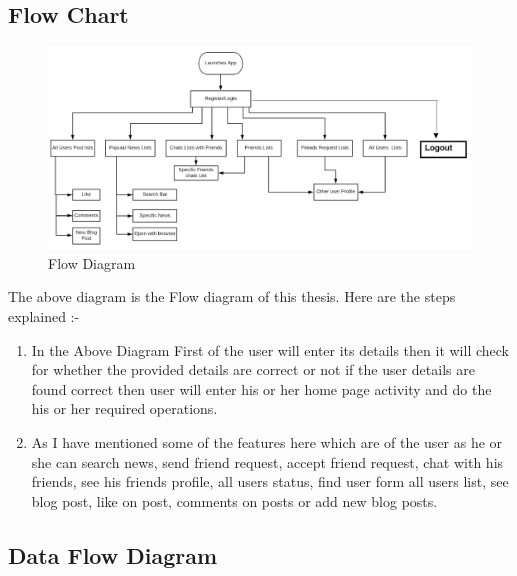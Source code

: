 \subsection{Flow Chart}
\noindent
\begin{figure}[!ht]
	\centering
	\includegraphics[scale=0.3]{flow-diagram.png}
	\caption{\label{img2} Flow Diagram}
\end{figure}

\noindent
The above diagram is the Flow diagram of this thesis. Here are the steps explained :-
\begin{enumerate}
	\setlength{\itemsep}{-0.3em}
	\item In the Above Diagram First of the user will enter its details then it will check
	for whether the provided details are correct or not if the user details are found
	correct then user will enter his or her home page activity and do the his or
	her required operations.\\
	\item As I have mentioned some of the features here which are of the user as he
	or she can search news, send friend request, accept friend request, chat with his friends, see his friends profile, all users status, find user form all users list, see blog post, like on post, comments on posts or add new blog posts.

\end{enumerate}

\subsection{Data Flow Diagram}


